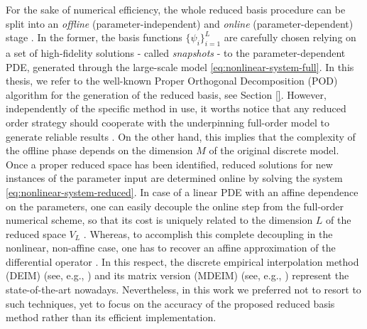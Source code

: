 \documentclass[12pt, a4paper, twoside, openright]{report}
\numberwithin{equation}{chapter}
\theoremstyle{theorem}
\theoremstyle{definition}
\theoremstyle{remark}
\theoremstyle{proposition}
\numberwithin{figure}{chapter}
\begin{document}
		For the sake of numerical efficiency, the whole reduced basis procedure can be split into an \emph{offline} (parameter-independent) and \emph{online} (parameter-dependent) stage \cite{Pru02}. In the former, the basis functions $\big\lbrace \psi_i \big\rbrace_{i = 1}^L$ are carefully chosen relying on a set of high-fidelity solutions - called \emph{snapshots} - to the parameter-dependent PDE, generated through the large-scale model \eqref{eq:nonlinear-system-full}. In this thesis, we refer to the well-known Proper Orthogonal Decomposition (POD) algorithm for the generation of the reduced basis, see Section \ref{}. However, independently of the specific method in use, it worths notice that any reduced order strategy should cooperate with the underpinning full-order model to generate reliable results \cite{HSR16}. On the other hand, this implies that the complexity of the offline phase depends on the dimension $M$ of the original discrete model. \\
		Once a proper reduced space has been identified, reduced solutions for new instances of the parameter input are determined online by solving the system \eqref{eq:nonlinear-system-reduced}. In case of a linear PDE with an affine dependence on the parameters, one can easily decouple the online step from the full-order numerical scheme, so that its cost is uniquely related to the dimension $L$ of the reduced space $V_L$ \cite{QMN15}. Whereas, to accomplish this complete decoupling in the nonlinear, non-affine case, one has to recover an affine approximation of the differential operator \cite{MN16}. In this respect, the discrete empirical interpolation method (DEIM) (see, e.g., \cite{Bar04}) and its matrix version (MDEIM) (see, e.g., \cite{NMA15}) represent the state-of-the-art nowadays. Nevertheless, in this work we preferred not to resort to such techniques, yet to focus on the accuracy of the proposed reduced basis method rather than its efficient implementation.
		
\end{document}
